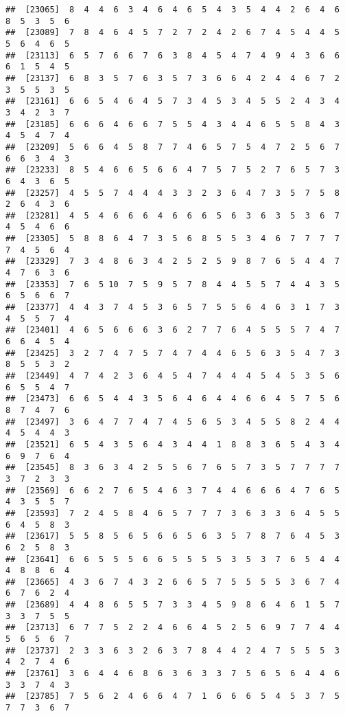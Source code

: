 \documentclass[
]{book}
\begin{document}
\begin{verbatim}
##  [23065]  8  4  4  6  3  4  6  4  6  5  4  3  5  4  4  2  6  4  6  8  5  3  5  6
##  [23089]  7  8  4  6  4  5  7  2  7  2  4  2  6  7  4  5  4  4  5  5  6  4  6  5
##  [23113]  6  5  7  6  6  7  6  3  8  4  5  4  7  4  9  4  3  6  6  6  1  5  4  5
##  [23137]  6  8  3  5  7  6  3  5  7  3  6  6  4  2  4  4  6  7  2  3  5  5  3  5
##  [23161]  6  6  5  4  6  4  5  7  3  4  5  3  4  5  5  2  4  3  4  3  4  2  3  7
##  [23185]  6  6  6  4  6  6  7  5  5  4  3  4  4  6  5  5  8  4  3  4  5  4  7  4
##  [23209]  5  6  6  4  5  8  7  7  4  6  5  7  5  4  7  2  5  6  7  6  6  3  4  3
##  [23233]  8  5  4  6  6  5  6  6  4  7  5  7  5  2  7  6  5  7  3  6  4  3  6  5
##  [23257]  4  5  5  7  4  4  4  3  3  2  3  6  4  7  3  5  7  5  8  2  6  4  3  6
##  [23281]  4  5  4  6  6  6  4  6  6  6  5  6  3  6  3  5  3  6  7  4  5  4  6  6
##  [23305]  5  8  8  6  4  7  3  5  6  8  5  5  3  4  6  7  7  7  7  7  4  5  6  4
##  [23329]  7  3  4  8  6  3  4  2  5  2  5  9  8  7  6  5  4  4  7  4  7  6  3  6
##  [23353]  7  6  5 10  7  5  9  5  7  8  4  4  5  5  7  4  4  3  5  6  5  6  6  7
##  [23377]  4  4  3  7  4  5  3  6  5  7  5  5  6  4  6  3  1  7  3  4  5  5  7  4
##  [23401]  4  6  5  6  6  6  3  6  2  7  7  6  4  5  5  5  7  4  7  6  6  4  5  4
##  [23425]  3  2  7  4  7  5  7  4  7  4  4  6  5  6  3  5  4  7  3  8  5  5  3  2
##  [23449]  4  7  4  2  3  6  4  5  4  7  4  4  4  5  4  5  3  5  6  6  5  5  4  7
##  [23473]  6  6  5  4  4  3  5  6  4  6  4  4  6  6  4  5  7  5  6  8  7  4  7  6
##  [23497]  3  6  4  7  7  4  7  4  5  6  5  3  4  5  5  8  2  4  4  4  5  4  4  3
##  [23521]  6  5  4  3  5  6  4  3  4  4  1  8  8  3  6  5  4  3  4  6  9  7  6  4
##  [23545]  8  3  6  3  4  2  5  5  6  7  6  5  7  3  5  7  7  7  7  3  7  2  3  3
##  [23569]  6  6  2  7  6  5  4  6  3  7  4  4  6  6  6  4  7  6  5  4  3  5  5  7
##  [23593]  7  2  4  5  8  4  6  5  7  7  7  3  6  3  3  6  4  5  5  6  4  5  8  3
##  [23617]  5  5  8  5  6  5  6  6  5  6  3  5  7  8  7  6  4  5  3  6  2  5  8  3
##  [23641]  6  6  5  5  5  6  6  5  5  5  5  3  5  3  7  6  5  4  4  4  8  8  6  4
##  [23665]  4  3  6  7  4  3  2  6  6  5  7  5  5  5  5  3  6  7  4  6  7  6  2  4
##  [23689]  4  4  8  6  5  5  7  3  3  4  5  9  8  6  4  6  1  5  7  3  3  7  5  5
##  [23713]  6  7  7  5  2  2  4  6  6  4  5  2  5  6  9  7  7  4  4  5  6  5  6  7
##  [23737]  2  3  3  6  3  2  6  3  7  8  4  4  2  4  7  5  5  5  3  4  2  7  4  6
##  [23761]  3  6  4  4  6  8  6  3  6  3  3  7  5  6  5  6  4  4  6  3  3  7  4  3
##  [23785]  7  5  6  2  4  6  6  4  7  1  6  6  6  5  4  5  3  7  5  7  7  3  6  7

\end{verbatim}
\end{document}
